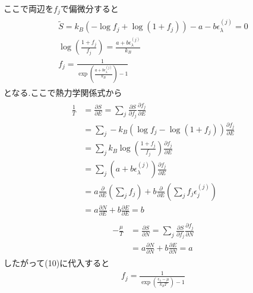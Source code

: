 ここで両辺を$f_j$で偏微分すると
\begin{align}
  \begin{split}
    \tilde{S}=k_B\left(-\log f_j+\log(1+f_j)\right)-a-b\epsilon_\lambda^{(j)}=0\\
    \log\left(\frac{1+f_j}{f_j}\right)=\frac{a+b\epsilon_\lambda^{(j)}}{k_B}\\
    f_j=\frac{1}{\exp\left(\frac{a+b\epsilon_\lambda^{(j)}}{k_B}\right)-1}
  \end{split}
\end{align}
となる.ここで熱力学関係式から
\begin{align}
  \begin{split}
    \frac{1}{T}&=\frac{\partial S}{\partial E}=\sum_j\frac{\partial S}{\partial f_j}\frac{\partial f_j}{\partial E}\\
    &=\sum_j-k_B(\log f_j-\log(1+f_j))\frac{\partial f_j}{\partial E}\\
    &=\sum_jk_B\log\left(\frac{1+f_j}{f_j}\right)\frac{\partial f_j}{\partial E}\\
    &=\sum_j(a+b\epsilon_\lambda^{(j)})\frac{\partial f_j}{\partial E}\\
    &=a\frac{\partial}{\partial E}\left(\sum_jf_j\right)+b\frac{\partial}{\partial E}\left(\sum_jf_j\epsilon_j^{(j)}\right)\\
    &=a\frac{\partial N}{\partial E}+b\frac{\partial E}{\partial E}=b
  \end{split}
\end{align}
\begin{align}
  \begin{split}
    -\frac{\mu}{T}&=\frac{\partial S}{\partial N}=\sum_j\frac{\partial S}{\partial f_j}\frac{\partial f_j}{\partial N}\\
    &=a\frac{\partial N}{\partial N}+b\frac{\partial E}{\partial N}=a
  \end{split}
\end{align}
したがって(10)に代入すると
\begin{align}
  f_j=\frac{1}{\exp\left(\frac{\epsilon_\lambda-\mu}{k_BT}\right)-1}
\end{align}